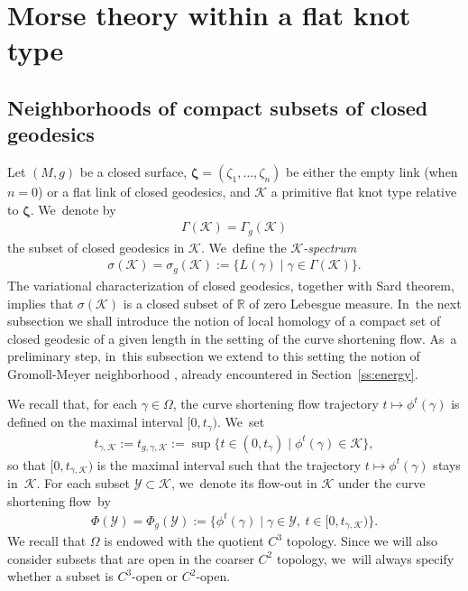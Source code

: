 \documentclass[11pt]{article}
\let\sep\mid
\let\bm\boldsymbol
\newcommand{\R}{\mathbb{R}}
\newcommand{\KK}{\mathcal{K}}
\theoremstyle{plain}
\theoremstyle{definition}
\begin{document}
\section{Morse theory within a flat knot type}\label{s:Morse}

\subsection{Neighborhoods of compact subsets of closed geodesics}\label{ss:nbhds}

Let $(M,g)$ be a closed surface, $\bm\zeta=(\zeta_1,\dots,\zeta_n)$ be either the empty link (when $n=0$) or a flat link of closed geodesics, and $\KK$ a primitive flat knot type relative to $\bm\zeta$. We~denote by
\begin{align*}
\Gamma(\KK)=\Gamma_g(\KK)
\end{align*}
the subset of closed geodesics in $\KK$. We~define the \emph{$\KK$-spectrum}
\begin{align*}
\sigma(\KK) = \sigma_g(\KK) := \big\{ L(\gamma)\sep \gamma\in\Gamma(\KK) \big\}.
\end{align*}
The variational characterization of closed geodesics, together with Sard theorem, implies that $\sigma(\KK)$ is a closed subset of $\R$ of zero Lebesgue measure. In~the next subsection we shall introduce the notion of local homology of a compact set of closed geodesic of a given length in the setting of the curve shortening flow. As~a preliminary step, in~this subsection we extend to this setting the notion of Gromoll-Meyer neighborhood \cite{Gromoll:1969aa,Gromoll:1969ab}, already encountered in Section~\ref{ss:energy}.

We recall that, for each $\gamma\in\Omega$, the curve shortening flow trajectory $t\mapsto\phi^t(\gamma)$ is defined on the maximal interval $[0,t_\gamma)$. We~set
\begin{align}
\label{e:exit_time_K}
t_{\gamma,\KK}:=t_{g,\gamma,\KK}:=\sup\bigl\{ t\in(0,t_{\gamma})\sep \phi^t(\gamma)\in\KK \bigr\},
\end{align}
so that $[0,t_{\gamma,\KK})$ is the maximal interval such that the trajectory $t\mapsto\phi^t(\gamma)$ stays in~$\KK$.
For each subset $\mathcal Y\subset\KK$, we~denote its flow-out in $\KK$ under the curve shortening flow~by
\begin{align*}
\Phi(\mathcal Y)
=
\Phi_g(\mathcal Y)
:=
\bigl\{ \phi^t(\gamma)\sep \gamma\in \mathcal Y,\ t\in[0,t_{\gamma,\KK}) \bigr\}.
\end{align*}
We recall that $\Omega$ is endowed with the quotient $C^3$ topology. Since we will also consider subsets that are open in the coarser $C^2$ topology, we~will always specify whether a subset is $C^3$-open or $C^2$-open.
\end{document}
